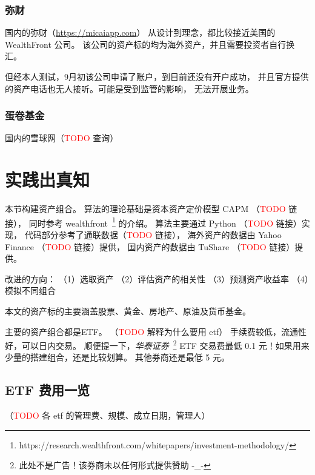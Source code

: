 \documentclass[a4paper, 11pt, UTF8]{report}
\begin{document}
\subsection{弥财}

国内的弥财（\underline{https://micaiapp.com}）
从设计到理念，都比较接近美国的 WealthFront 公司。
该公司的资产标的均为海外资产，并且需要投资者自行换汇。

但经本人测试，9月初该公司申请了账户，到目前还没有开户成功，
并且官方提供的资产电话也无人接听。可能是受到监管的影响，
无法开展业务。

\subsection{蛋卷基金}

国内的雪球网（\textcolor{red}{TODO} 查询）


\chapter{实践出真知}


本节构建资产组合。
算法的理论基础是资本资产定价模型 CAPM （\textcolor{red}{TODO} 链接），
同时参考 
wealthfront~\footnote{https://research.wealthfront.com/whitepapers/investment-methodology/}
的介绍。
算法主要通过 Python （\textcolor{red}{TODO} 链接）实现，
代码部分参考了通联数据（\textcolor{red}{TODO} 链接），
海外资产的数据由 Yahoo Finance （\textcolor{red}{TODO} 链接）提供，
国内资产的数据由 TuShare （\textcolor{red}{TODO} 链接）提供。

改进的方向：
（1）选取资产
（2）评估资产的相关性
（3）预测资产收益率
（4）模拟不同组合

本文的资产标的主要涵盖股票、黄金、房地产、原油及货币基金。

主要的资产组合都是ETF。
（\textcolor{red}{TODO} 解释为什么要用 etf）
手续费较低，流通性好，可以日内交易。
顺便提一下，\emph{华泰证券}~\footnote{此处不是广告！该券商未以任何形式提供赞助 -\_- }
 ETF 交易费最低 0.1 元！如果用来少量的搭建组合，还是比较划算。
其他券商还是最低 5 元。



\section{ETF 费用一览}

（\textcolor{red}{TODO} 各 etf 的管理费、规模、成立日期，管理人）
\end{document}
